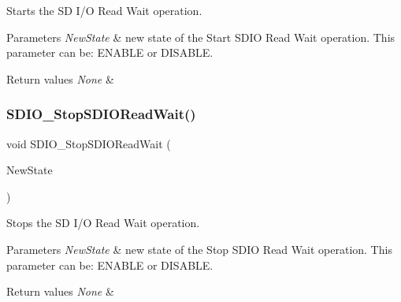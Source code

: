 Starts the SD I/O Read Wait operation. 


\begin{DoxyParams}{Parameters}
{\em New\+State} & new state of the Start S\+D\+IO Read Wait operation. This parameter can be\+: E\+N\+A\+B\+LE or D\+I\+S\+A\+B\+LE. \\
\hline
\end{DoxyParams}

\begin{DoxyRetVals}{Return values}
{\em None} & \\
\hline
\end{DoxyRetVals}
\mbox{\label{group___s_d_i_o___exported___functions_gaca6b25eb2debb73ac827c66f0ebcf837}} 
\subsubsection{\texorpdfstring{SDIO\_StopSDIOReadWait()}{SDIO\_StopSDIOReadWait()}}
{\footnotesize\ttfamily void S\+D\+I\+O\+\_\+\+Stop\+S\+D\+I\+O\+Read\+Wait (\begin{DoxyParamCaption}\item[{\mbox{\hyperlink{group___exported__types_gac9a7e9a35d2513ec15c3b537aaa4fba1}{Functional\+State}}}]{New\+State }\end{DoxyParamCaption})}



Stops the SD I/O Read Wait operation. 


\begin{DoxyParams}{Parameters}
{\em New\+State} & new state of the Stop S\+D\+IO Read Wait operation. This parameter can be\+: E\+N\+A\+B\+LE or D\+I\+S\+A\+B\+LE. \\
\hline
\end{DoxyParams}

\begin{DoxyRetVals}{Return values}
{\em None} & \\
\hline
\end{DoxyRetVals}
\mbox{\label{group___s_d_i_o___exported___functions_ga778d338c29df4fae9ef69432e6df32ad}} 
